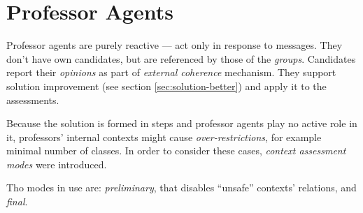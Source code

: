 \documentclass[../../header]{subfiles}
\begin{document}
\providecommand{\rootdir}{../..}


\section{Professor Agents}
Professor agents are purely reactive --- act only in response to messages.
They don't have own candidates, but are referenced by those of the \emph{groups}.
Candidates report their \emph{opinions} as part of \emph{external coherence}
mechanism. They support solution improvement (see section \ref{sec:solution-better})
and apply it to the assessments.

Because the solution is formed in steps and professor agents play no active role
in it, professors' internal contexts might cause \emph{over-restrictions}, for
example minimal number of classes. In order to consider these cases,
\emph{context assessment modes} were introduced.

Tho modes in use are: \emph{preliminary}, that disables ``unsafe'' contexts' relations,
and \emph{final}.
\end{document}
